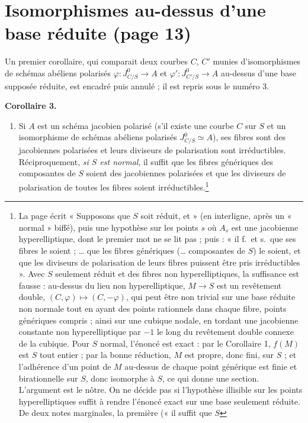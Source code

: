 \documentclass[11pt,a4paper]{article}
\begin{document}
\section*{Isomorphismes au-dessus d'une base réduite (page 13)}

Un premier corollaire, qui comparait deux courbes $C$, $C'$ munies
d'isomorphismes de schémas abéliens polarisés $\varphi : J^{0}_{C/S} \to A$ et
$\varphi' : J^{0}_{C'/S} \to A$ au-dessus d'une base supposée réduite, est
encadré puis annulé ; il est repris sous le numéro 3.

\textbf{Corollaire 3.}

\begin{enumerate}
\item[(i)] Si $A$ est un schéma jacobien polarisé (s'il existe une courbe
$C$ sur $S$ et un isomorphisme de schémas abéliens polarisés
$J^{0}_{C/S} \simeq A$), ses fibres sont des jacobiennes polarisées et
leurs diviseurs de polarisation sont irréductibles. Réciproquement, \emph{si
$S$ est normal}, il suffit que les fibres génériques des composantes de $S$
soient des jacobiennes polarisées et que les diviseurs de polarisation de
toutes les fibres soient irréductibles.\footnote{La page écrit « Supposons que
$S$ soit réduit, et » (en interligne, après un « normal » biffé), puis une
hypothèse sur les points $s$ où $A_{s}$ est une jacobienne hyperelliptique,
dont le premier mot ne se lit pas ; puis : « il f.\ et s.\ que ses fibres le
soient ; … que les fibres génériques (… composantes de $S$) le soient, et que
les diviseurs de polarisation de leurs fibres puissent être pris
irréductibles ». Avec $S$ seulement réduit et des fibres non
hyperelliptiques, la suffisance est fausse : au-dessus du lieu non
hyperelliptique, $M \to S$ est un revêtement double, $(C, \varphi) \mapsto
(C, -\varphi)$, qui peut être non trivial sur une base réduite non normale
tout en ayant des points rationnels dans chaque fibre, points génériques
compris ; ainsi sur une cubique nodale, en tordant une jacobienne constante
non hyperelliptique par $-1$ le long du revêtement double connexe de la
cubique. Pour $S$ normal, l'énoncé est exact : par le Corollaire 1, $f(M)$
est $S$ tout entier ; par la bonne réduction, $M$ est propre, donc fini, sur
$S$ ; et l'adhérence d'un point de $M$ au-dessus de chaque point générique est
finie et birationnelle sur $S$, donc isomorphe à $S$, ce qui donne une
section. L'argument est le nôtre. On ne décide pas si l'hypothèse illisible
sur les points hyperelliptiques suffit à rendre l'énoncé exact sur une base
seulement réduite. De deux notes marginales, la première (« il suffit que $S$
}
\end{enumerate}
\end{document}
